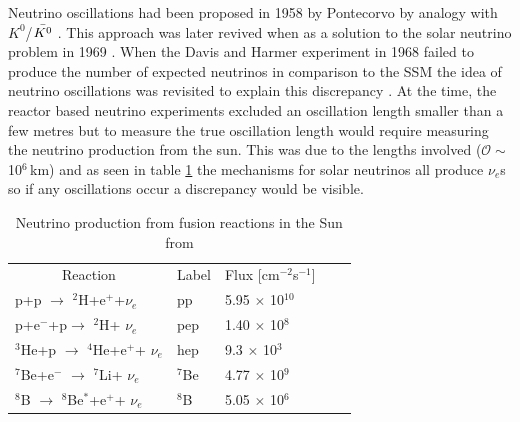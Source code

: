 Neutrino oscillations had been proposed in 1958 by Pontecorvo by analogy with $K^0$/$\Bar{K^0}$   \cite{griffiths2008neutrinoOscillations} \cite{pontecorvo1958_OscillationProposal}. This approach was later revived when as a solution to the solar neutrino problem in 1969 \cite{pontecorvo_gibov_1969_solar_oscillation}. When the Davis and Harmer experiment in 1968 failed to produce the number of expected neutrinos in comparison to the SSM the idea of neutrino oscillations was revisited to explain this discrepancy \cite{pontecorvo_gibov_1969_solar_oscillation}. At the time, the reactor based neutrino experiments excluded an oscillation length smaller than a few metres but to measure the true oscillation length would require measuring the neutrino production from the sun. This was due to the lengths involved ($\mathcal{O} \sim$ 10$^6$\,km) \cite{pontecorvo_gibov_1969_solar_oscillation} and as seen in table \ref{solar_nuetrino_table} the mechanisms for solar neutrinos all produce $\nu_e$s so if any oscillations occur a discrepancy would be visible. 

\begin{table}[!h]
\centering
\begin{tabular}{lllll}  
\toprule
\multicolumn{1}{c}{Reaction} & \multicolumn{1}{c}{Label} & \multicolumn{1}{c}{Flux [cm$^{-2}$s$^{-1}$]}
\\
\cmidrule(r){1-1}
\cmidrule(r){2-2}
\cmidrule(r){3-3}
p+p $\rightarrow$ $^2$H+e$^+$+$\nu_e$           & pp                & 5.95 $\times$ 10$^{10}$\\
p+e$^-$+p$\rightarrow$ $^2$H+ $\nu_e$           & pep               & 1.40 $\times$ 10$^{8}$\\
$^3$He+p $\rightarrow$ $^4$He+e$^+$+ $\nu_e$    & hep               & 9.3  $\times$ 10$^{3}$\\
$^7$Be+e$^-$ $\rightarrow$ $^7$Li+ $\nu_e$      & $^7$Be            & 4.77 $\times$ 10$^{9}$\\
$^8$B $\rightarrow$ $^8$Be$^*$+e$^+$+ $\nu_e$   & $^8$B             & 5.05 $\times$ 10$^{6}$\\
\bottomrule   
\end{tabular}
\caption{Neutrino production from fusion reactions in the Sun from \cite{Bellerive:2003rj} }
\label{solar_nuetrino_table}
\end{table}


